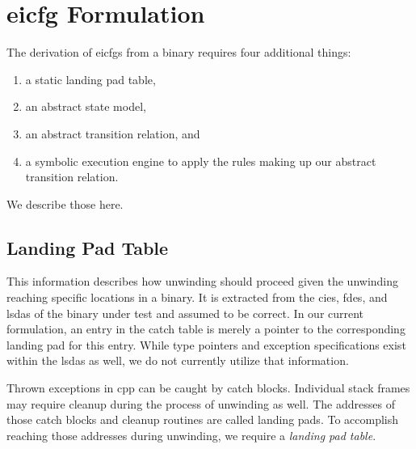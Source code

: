 \chapter{\Acs*{eicfg} Formulation}\label{ch:eicfg-formulation}

The derivation of \acp{eicfg} from a binary requires four additional things:
\begin{enumerate}
    \item a static landing pad table,
    \item an abstract state model,
    \item an abstract transition relation, and
    \item a symbolic execution engine to apply the rules making up our abstract transition relation.
\end{enumerate}
We describe those here.

\section{Landing Pad Table}\label{sec:landing-pad-table}
This information describes how unwinding should proceed given the unwinding reaching specific locations in a binary.
It is extracted from the \acp{cie}, \acp{fde}, and \acp{lsda} of the binary under test and assumed to be correct.
In our current formulation, an entry in the catch table is merely a pointer to the corresponding landing pad for this entry.
While type pointers and exception specifications exist within the \acp{lsda} as well, we do not currently utilize that information.

Thrown exceptions in \gls{cpp} can be caught by catch blocks.
Individual stack frames may require cleanup during the process of unwinding as well.
The addresses of those catch blocks and cleanup routines are called landing pads.
To accomplish reaching those addresses during unwinding, we require a \emph{landing pad table}.

